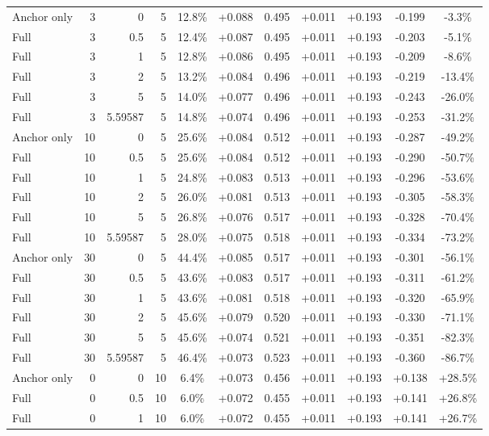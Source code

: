 \begin{table}[htbp]
\begin{tabular}{lrrrccccccc}
Anchor only & 3 & 0 & 5 & 12.8\% & +0.088 & 0.495 & +0.011 & +0.193 & -0.199 & -3.3\% \\
Full & 3 & 0.5 & 5 & 12.4\% & +0.087 & 0.495 & +0.011 & +0.193 & -0.203 & -5.1\% \\
Full & 3 & 1 & 5 & 12.8\% & +0.086 & 0.495 & +0.011 & +0.193 & -0.209 & -8.6\% \\
Full & 3 & 2 & 5 & 13.2\% & +0.084 & 0.496 & +0.011 & +0.193 & -0.219 & -13.4\% \\
Full & 3 & 5 & 5 & 14.0\% & +0.077 & 0.496 & +0.011 & +0.193 & -0.243 & -26.0\% \\
Full & 3 & 5.59587 & 5 & 14.8\% & +0.074 & 0.496 & +0.011 & +0.193 & -0.253 & -31.2\% \\
Anchor only & 10 & 0 & 5 & 25.6\% & +0.084 & 0.512 & +0.011 & +0.193 & -0.287 & -49.2\% \\
Full & 10 & 0.5 & 5 & 25.6\% & +0.084 & 0.512 & +0.011 & +0.193 & -0.290 & -50.7\% \\
Full & 10 & 1 & 5 & 24.8\% & +0.083 & 0.513 & +0.011 & +0.193 & -0.296 & -53.6\% \\
Full & 10 & 2 & 5 & 26.0\% & +0.081 & 0.513 & +0.011 & +0.193 & -0.305 & -58.3\% \\
Full & 10 & 5 & 5 & 26.8\% & +0.076 & 0.517 & +0.011 & +0.193 & -0.328 & -70.4\% \\
Full & 10 & 5.59587 & 5 & 28.0\% & +0.075 & 0.518 & +0.011 & +0.193 & -0.334 & -73.2\% \\
Anchor only & 30 & 0 & 5 & 44.4\% & +0.085 & 0.517 & +0.011 & +0.193 & -0.301 & -56.1\% \\
Full & 30 & 0.5 & 5 & 43.6\% & +0.083 & 0.517 & +0.011 & +0.193 & -0.311 & -61.2\% \\
Full & 30 & 1 & 5 & 43.6\% & +0.081 & 0.518 & +0.011 & +0.193 & -0.320 & -65.9\% \\
Full & 30 & 2 & 5 & 45.6\% & +0.079 & 0.520 & +0.011 & +0.193 & -0.330 & -71.1\% \\
Full & 30 & 5 & 5 & 45.6\% & +0.074 & 0.521 & +0.011 & +0.193 & -0.351 & -82.3\% \\
Full & 30 & 5.59587 & 5 & 46.4\% & +0.073 & 0.523 & +0.011 & +0.193 & -0.360 & -86.7\% \\
Anchor only & 0 & 0 & 10 & 6.4\% & +0.073 & 0.456 & +0.011 & +0.193 & +0.138 & +28.5\% \\
Full & 0 & 0.5 & 10 & 6.0\% & +0.072 & 0.455 & +0.011 & +0.193 & +0.141 & +26.8\% \\
Full & 0 & 1 & 10 & 6.0\% & +0.072 & 0.455 & +0.011 & +0.193 & +0.141 & +26.7\% \\

\end{tabular}
\end{table}

